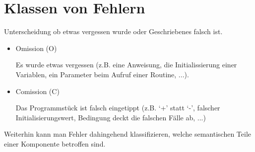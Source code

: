 
\newpage

\section*{Klassen von Fehlern}

Unterscheidung ob etwas vergessen wurde oder Geschriebenes falsch ist.
\begin{itemize}

\item Omission (O)

Es wurde etwas vergessen (z.B. eine Anweisung, die
Initialissierung einer Variablen, ein Parameter beim Aufruf einer
Routine, ...).

\item Comission (C)

Das Programmst\"uck ist falsch eingetippt (z.B. `+'
statt `-', falscher Initialisierungswert, Bedingung deckt die falschen
F\"alle ab, ...)

\end{itemize}

Weiterhin kann man Fehler dahingehend klassifizieren, welche
semantischen Teile einer Komponente betroffen sind.

